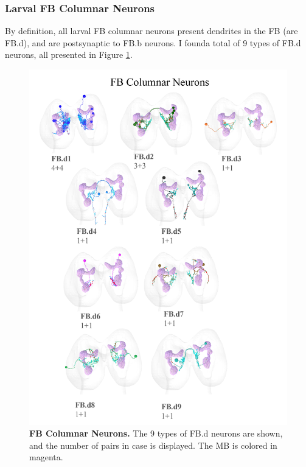         \subsubsection{Larval FB Columnar Neurons}


            By definition, all larval FB columnar neurons present dendrites in the FB (are FB.d), and are postsynaptic to FB.b neurons. I founda total of 9 types of FB.d neurons, all presented in Figure \ref{FBColumnar}. 

            \begin{figure}
                \centering
                \includegraphics[width=15cm]{Figs/CX/FBColumnar.pdf}
                \caption[FB Columnar Neurons]{\textbf{FB Columnar Neurons.} The 9 types of FB.d neurons are shown, and the number of pairs in case is displayed. The MB is colored in magenta. }
                \label{FBColumnar}
            \end{figure}


